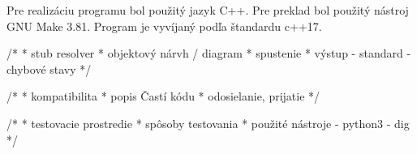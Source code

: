 %

Pre realizáciu programu bol použitý jazyk C++. Pre preklad bol použitý nástroj GNU Make 3.81. Program je vyvíjaný podľa štandardu c++17.

/*
 * stub resolver
 * objektový nárvh / diagram
 * spustenie
 * výstup   - standard
            - chybové stavy
 */



/*
 * kompatibilita
 * popis Častí kódu 
 * odosielanie, prijatie 
 */


/*
 * testovacie prostredie
 * spôsoby testovania
 * použité nástroje - python3
                    - dig 
 */

\cite[Hello]{Pravidla}

